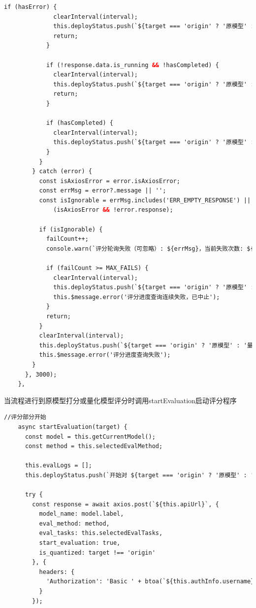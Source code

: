 \documentclass[AutoFakeBold,AutoFakeSlant,language=chinese,degree=bachelor]{sustechthesis}
\begin{document}
\begin{itemize}
\begin{lstlisting}[language=HTML]
            if (hasError) {
              clearInterval(interval);
              this.deployStatus.push(`${target === 'origin' ? '原模型' : '量化模型'} 评分失败，请检查日志`);
              return;
            }

            if (!response.data.is_running && !hasCompleted) {
              clearInterval(interval);
              this.deployStatus.push(`${target === 'origin' ? '原模型' : '量化模型'} 评分中断但未检测到“完成”关键词，可能失败`);
              return;
            }

            if (hasCompleted) {
              clearInterval(interval);
              this.deployStatus.push(`${target === 'origin' ? '原模型' : '量化模型'} 评分完成`);
            }
          }
        } catch (error) {
          const isAxiosError = error.isAxiosError;
          const errMsg = error?.message || '';
          const isIgnorable = errMsg.includes('ERR_EMPTY_RESPONSE') ||
              (isAxiosError && !error.response);

          if (isIgnorable) {
            failCount++;
            console.warn(`评分轮询失败（可忽略）: ${errMsg}，当前失败次数: ${failCount}`);

            if (failCount >= MAX_FAILS) {
              clearInterval(interval);
              this.deployStatus.push(`${target === 'origin' ? '原模型' : '量化模型'} 连续多次无法获取评分进度，任务可能失败`);
              this.$message.error('评分进度查询连续失败，已中止');
            }
            return;
          }
          clearInterval(interval);
          this.deployStatus.push(`${target === 'origin' ? '原模型' : '量化模型'} 评分进度获取失败: ${errMsg}`);
          this.$message.error('评分进度查询失败');
        }
      }, 3000);
    },
    \end{lstlisting}
    当流程进行到原模型打分或量化模型评分时调用startEvaluation启动评分程序
    \begin{lstlisting}[language=HTML]
    //评分部分开始
    async startEvaluation(target) {
      const model = this.getCurrentModel();
      const method = this.selectedEvalMethod;

      this.evalLogs = [];
      this.deployStatus.push(`开始对 ${target === 'origin' ? '原模型' : '量化模型'} 进行评分（方法：${method}）...`);

      try {
        const response = await axios.post(`${this.apiUrl}`, {
          model_name: model.label,
          eval_method: method,
          eval_tasks: this.selectedEvalTasks,
          start_evaluation: true,
          is_quantized: target !== 'origin'
        }, {
          headers: {
            'Authorization': 'Basic ' + btoa(`${this.authInfo.username}:${this.authInfo.password}`)
          }
        });


\end{lstlisting}
\end{itemize}
\end{document}
